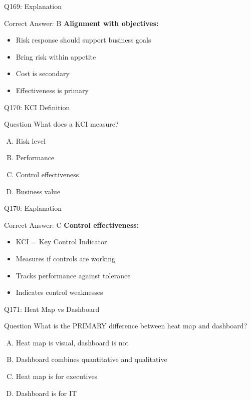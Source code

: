 \documentclass{beamer}
\begin{document}
	\begin{frame}{Q169: Explanation}
		\begin{block}{Correct Answer: B}
			\textbf{Alignment with objectives:}
			\begin{itemize}
				\item Risk response should support business goals
				\item Bring risk within appetite
				\item Cost is secondary
				\item Effectiveness is primary
			\end{itemize}
		\end{block}
	\end{frame}
	
	\begin{frame}{Q170: KCI Definition}
		\begin{block}{Question}
			What does a KCI measure?
		\end{block}
		\begin{enumerate}[(A)]
			\item Risk level
			\item Performance
			\item Control effectiveness
			\item Business value
		\end{enumerate}
	\end{frame}
	
	\begin{frame}{Q170: Explanation}
		\begin{block}{Correct Answer: C}
			\textbf{Control effectiveness:}
			\begin{itemize}
				\item KCI = Key Control Indicator
				\item Measures if controls are working
				\item Tracks performance against tolerance
				\item Indicates control weaknesses
			\end{itemize}
		\end{block}
	\end{frame}
	
	\begin{frame}{Q171: Heat Map vs Dashboard}
		\begin{block}{Question}
			What is the PRIMARY difference between heat map and dashboard?
		\end{block}
		\begin{enumerate}[(A)]
			\item Heat map is visual, dashboard is not
			\item Dashboard combines quantitative and qualitative
			\item Heat map is for executives
			\item Dashboard is for IT
		\end{enumerate}
	\end{frame}
	
\end{document}
